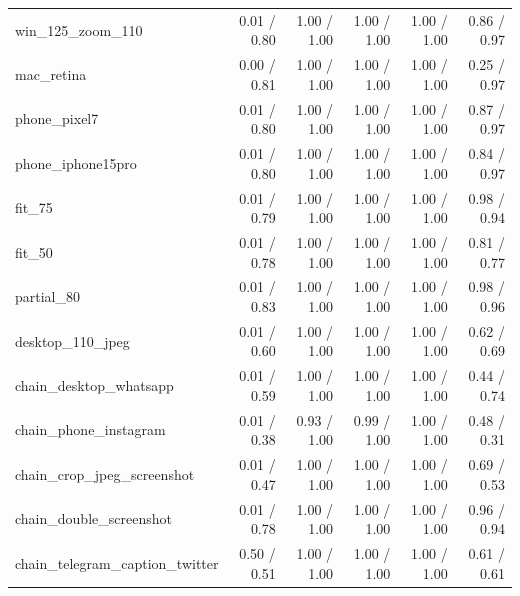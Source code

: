 \begin{tabular}{lrrrrr}
win\_125\_zoom\_110 & 0.01 / 0.80 & 1.00 / 1.00 & 1.00 / 1.00 & 1.00 / 1.00 & 0.86 / 0.97 \\
mac\_retina & 0.00 / 0.81 & 1.00 / 1.00 & 1.00 / 1.00 & 1.00 / 1.00 & 0.25 / 0.97 \\
phone\_pixel7 & 0.01 / 0.80 & 1.00 / 1.00 & 1.00 / 1.00 & 1.00 / 1.00 & 0.87 / 0.97 \\
phone\_iphone15pro & 0.01 / 0.80 & 1.00 / 1.00 & 1.00 / 1.00 & 1.00 / 1.00 & 0.84 / 0.97 \\
fit\_75 & 0.01 / 0.79 & 1.00 / 1.00 & 1.00 / 1.00 & 1.00 / 1.00 & 0.98 / 0.94 \\
fit\_50 & 0.01 / 0.78 & 1.00 / 1.00 & 1.00 / 1.00 & 1.00 / 1.00 & 0.81 / 0.77 \\
partial\_80 & 0.01 / 0.83 & 1.00 / 1.00 & 1.00 / 1.00 & 1.00 / 1.00 & 0.98 / 0.96 \\
desktop\_110\_jpeg & 0.01 / 0.60 & 1.00 / 1.00 & 1.00 / 1.00 & 1.00 / 1.00 & 0.62 / 0.69 \\
chain\_desktop\_whatsapp & 0.01 / 0.59 & 1.00 / 1.00 & 1.00 / 1.00 & 1.00 / 1.00 & 0.44 / 0.74 \\
chain\_phone\_instagram & 0.01 / 0.38 & 0.93 / 1.00 & 0.99 / 1.00 & 1.00 / 1.00 & 0.48 / 0.31 \\
chain\_crop\_jpeg\_screenshot & 0.01 / 0.47 & 1.00 / 1.00 & 1.00 / 1.00 & 1.00 / 1.00 & 0.69 / 0.53 \\
chain\_double\_screenshot & 0.01 / 0.78 & 1.00 / 1.00 & 1.00 / 1.00 & 1.00 / 1.00 & 0.96 / 0.94 \\
chain\_telegram\_caption\_twitter & 0.50 / 0.51 & 1.00 / 1.00 & 1.00 / 1.00 & 1.00 / 1.00 & 0.61 / 0.61 \\
\bottomrule
\end{tabular}
